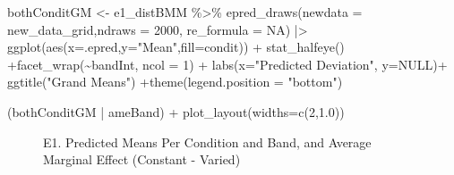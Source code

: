 \documentclass[
  letterpaper,
  DIV=11,
  numbers=noendperiod]{scrartcl}
\newenvironment{Shaded}{\begin{snugshade}}{\end{snugshade}}
\newcommand{\AttributeTok}[1]{\textcolor[rgb]{0.40,0.45,0.13}{#1}}
\newcommand{\ConstantTok}[1]{\textcolor[rgb]{0.56,0.35,0.01}{#1}}
\newcommand{\DecValTok}[1]{\textcolor[rgb]{0.68,0.00,0.00}{#1}}
\newcommand{\FloatTok}[1]{\textcolor[rgb]{0.68,0.00,0.00}{#1}}
\newcommand{\FunctionTok}[1]{\textcolor[rgb]{0.28,0.35,0.67}{#1}}
\newcommand{\NormalTok}[1]{\textcolor[rgb]{0.00,0.23,0.31}{#1}}
\newcommand{\OtherTok}[1]{\textcolor[rgb]{0.00,0.23,0.31}{#1}}
\newcommand{\SpecialCharTok}[1]{\textcolor[rgb]{0.37,0.37,0.37}{#1}}
\newcommand{\StringTok}[1]{\textcolor[rgb]{0.13,0.47,0.30}{#1}}
\begin{document}
\begin{Shaded}
\begin{Highlighting}[]
\NormalTok{bothConditGM }\OtherTok{\textless{}{-}}\NormalTok{ e1\_distBMM }\SpecialCharTok{\%\textgreater{}\%}
  \FunctionTok{epred\_draws}\NormalTok{(}\AttributeTok{newdata =}\NormalTok{ new\_data\_grid,}\AttributeTok{ndraws =} \DecValTok{2000}\NormalTok{, }\AttributeTok{re\_formula =} \ConstantTok{NA}\NormalTok{) }\SpecialCharTok{|\textgreater{}}
  \FunctionTok{ggplot}\NormalTok{(}\FunctionTok{aes}\NormalTok{(}\AttributeTok{x=}\NormalTok{.epred,}\AttributeTok{y=}\StringTok{"Mean"}\NormalTok{,}\AttributeTok{fill=}\NormalTok{condit)) }\SpecialCharTok{+} 
  \FunctionTok{stat\_halfeye}\NormalTok{() }\SpecialCharTok{+}\FunctionTok{facet\_wrap}\NormalTok{(}\SpecialCharTok{\textasciitilde{}}\NormalTok{bandInt, }\AttributeTok{ncol =} \DecValTok{1}\NormalTok{) }\SpecialCharTok{+}
  \FunctionTok{labs}\NormalTok{(}\AttributeTok{x=}\StringTok{"Predicted Deviation"}\NormalTok{, }\AttributeTok{y=}\ConstantTok{NULL}\NormalTok{)}\SpecialCharTok{+}
  \FunctionTok{ggtitle}\NormalTok{(}\StringTok{"Grand Means"}\NormalTok{) }\SpecialCharTok{+}\FunctionTok{theme}\NormalTok{(}\AttributeTok{legend.position =} \StringTok{"bottom"}\NormalTok{)}

\NormalTok{(bothConditGM }\SpecialCharTok{|}\NormalTok{ ameBand) }\SpecialCharTok{+} \FunctionTok{plot\_layout}\NormalTok{(}\AttributeTok{widths=}\FunctionTok{c}\NormalTok{(}\DecValTok{2}\NormalTok{,}\FloatTok{1.0}\NormalTok{))}
\end{Highlighting}
\end{Shaded}

\begin{figure}[H]


\caption{\label{fig-e1-ame}E1. Predicted Means Per Condition and Band,
and Average Marginal Effect (Constant - Varied)}

\end{figure}%
\end{document}
